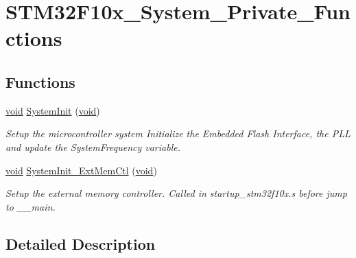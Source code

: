 \hypertarget{group___s_t_m32_f10x___system___private___functions}{\section{S\-T\-M32\-F10x\-\_\-\-System\-\_\-\-Private\-\_\-\-Functions}
\label{group___s_t_m32_f10x___system___private___functions}
}
\subsection*{Functions}
\begin{DoxyCompactItemize}
\item 
\hyperlink{group___n_a_m_e_ga18028b8badbf1ea7e704ccac3c488e82}{void} \hyperlink{group___s_t_m32_f10x___system___private___functions_ga93f514700ccf00d08dbdcff7f1224eb2}{System\-Init} (\hyperlink{group___n_a_m_e_ga18028b8badbf1ea7e704ccac3c488e82}{void})
\begin{DoxyCompactList}\small\item\em Setup the microcontroller system Initialize the Embedded Flash Interface, the P\-L\-L and update the System\-Frequency variable. \end{DoxyCompactList}\item 
\hyperlink{group___n_a_m_e_ga18028b8badbf1ea7e704ccac3c488e82}{void} \hyperlink{group___s_t_m32_f10x___system___private___functions_ga59fdd3019d74530ea5d197a652393923}{System\-Init\-\_\-\-Ext\-Mem\-Ctl} (\hyperlink{group___n_a_m_e_ga18028b8badbf1ea7e704ccac3c488e82}{void})
\begin{DoxyCompactList}\small\item\em Setup the external memory controller. Called in startup\-\_\-stm32f10x.\-s before jump to \-\_\-\-\_\-main. \end{DoxyCompactList}\end{DoxyCompactItemize}


\subsection{Detailed Description}


